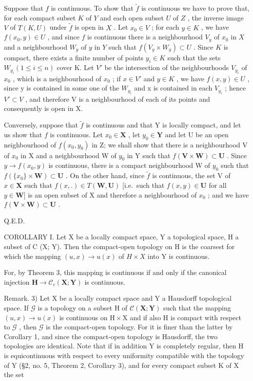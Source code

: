 Suppose that \(f\) is continuous. To show that \(\tilde{f}\) is continuous we have to prove that, for each compact subset \(K\) of \(Y\) and each open subset \(U\) of \(Z\) , the inverse image \(V\) of \(T(K, U)\) under \(\tilde{f}\) is open in \(X\) . Let \(x_0 \in V\) ; for each \(y \in K\) , we have \(f(x_0, y) \in U\) , and since \(f\) is continuous there is a neighbourhood \(V_y\) of \(x_0\) in \(X\) and a neighbourhood \(W_y\) of \(y\) in \(Y\) such that \(f(V_y \times W_y) \subset U\) . Since \(K\) is compact, there exists a finite number of points \(y_{i} \in K\) such that the sets \(W_{y_{i}}(1 \leqslant i \leqslant n)\) cover K. Let \(V'\) be the intersection of the neighbourhoods \(V_{y_{i}}\) of \(x_{0}\) , which is a neighbourhood of \(x_{0}\) ; if \(x \in V'\) and \(y \in K\) , we have \(f(x, y) \in U\) , since y is contained in some one of the \(W_{y_{i}}\) and x is contained in each \(V_{y_{i}}\) ; hence \(V' \subset V\) , and therefore V is a neighbourhood of each of its points and consequently is open in X.

Conversely, suppose that \(\tilde{f}\) is continuous and that Y is locally compact, and let us show that \(f\) is continuous. Let \(x_0 \in \mathbf{X}\) , let \(y_0 \in \mathbf{Y}\) and let U be an open neighbourhood of \(f(x_0, y_0)\) in Z; we shall show that there is a neighbourhood V of \(x_0\) in X and a neighbourhood W of \(y_0\) in Y such that \(f(\mathbf{V} \times \mathbf{W}) \subset \mathbf{U}\) . Since \(y \to f(x_0, y)\) is continuous, there is a compact neighbourhood W of \(y_0\) such that \(f(\{x_0\} \times \mathbf{W}) \subset \mathbf{U}\) . On the other hand, since \(\tilde{f}\) is continuous, the set V of \(x \in \mathbf{X}\) such that \(f(x, .) \in T(\mathbf{W}, \mathbf{U})\) {[}i.e.~such that \(f(x, y) \in \mathbf{U}\) for all \(y \in \mathbf{W}]\) is an open subset of X and therefore a neighbourhood of \(x_0\) ; and we have \(f(\mathbf{V} \times \mathbf{W}) \subset \mathbf{U}\) .

Q.E.D.

COROLLARY I. Let X be a locally compact space, Y a topological space, H a subset of C (X; Y). Then the compact-open topology on H is the coarsest for which the mapping \((u, x) \to u(x)\) of \(H \times X\) into Y is continuous.

For, by Theorem 3, this mapping is continuous if and only if the canonical injection \(\mathbf{H} \to \mathcal{C}_c(\mathbf{X}; \mathbf{Y})\) is continuous.

Remark. 3) Let X be a locally compact space and Y a Hausdorff topological space. If \(\mathcal{G}\) is a topology on a subset H of \(\mathcal{C}(\mathbf{X};\mathbf{Y})\) such that the mapping \((u,x)\to u(x)\) is continuous on \(\mathrm{H}\times \mathrm{X}\) and if also H is compact with respect to \(\mathcal{G}\) , then \(\mathcal{G}\) is the compact-open topology. For it is finer than the latter by Corollary 1, and since the compact-open topology is Hausdorff, the two topologies are identical. Note that if in addition Y is completely regular, then H is equicontinuous with respect to every uniformity compatible with the topology of Y (§2, no. 5, Theorem 2, Corollary 3), and for every compact subset K of X the set

